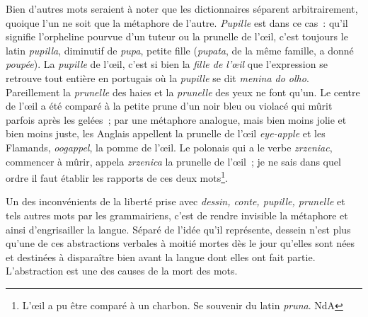 \documentclass[french,twoside]{book} %
\begin{document}
Bien d’autres mots seraient à noter que les dictionnaires séparent arbitrairement, quoique l’un ne soit que la métaphore de l’autre. {\itshape Pupille} est dans ce cas : qu’il signifie l’orpheline pourvue d’un tuteur ou la prunelle de l’œil, c’est toujours le latin {\itshape pupilla}, diminutif de {\itshape pupa}, petite fille ({\itshape pupata}, de la même famille, a donné {\itshape poupée}). La {\itshape pupille} de l’œil, c’est si bien la {\itshape fille de l’œil} que l’expression se retrouve tout entière en portugais où la {\itshape pupille} se dit {\itshape menina do olho}. Pareillement la {\itshape prunelle} des haies et la {\itshape prunelle} des yeux ne font qu’un. Le centre de l’œil a été comparé à la petite prune d’un noir bleu ou violacé qui mûrit parfois après les gelées ; par une métaphore analogue, mais bien moins jolie et bien moins juste, les Anglais appellent la prunelle de l’œil {\itshape eye-apple} et les Flamands, {\itshape oogappel}, la pomme de l’œil. Le polonais qui a le verbe {\itshape zrzeniac}, commencer à mûrir, appela {\itshape zrzenica} la prunelle de l’œil ; je ne sais dans quel ordre il faut établir les rapports de ces deux mots\footnote{ L’œil a pu être comparé à un charbon. Se souvenir du latin {\itshape pruna}. NdA}.\par
Un des inconvénients de la liberté prise avec {\itshape dessin, conte, pupille, prunelle} et tels autres mots par les grammairiens, c’est de rendre invisible la métaphore et ainsi d’engrisailler la langue. Séparé de l’idée qu’il représente, dessein n’est plus qu’une de ces abstractions verbales à moitié mortes dès le jour qu’elles sont nées et destinées à disparaître bien avant la langue dont elles ont fait partie. L’abstraction est une des causes de la mort des mots.\par
\end{document}
